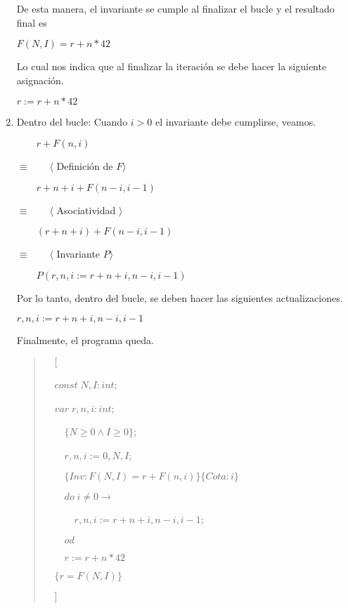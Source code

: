 \documentclass[hidelinks]{article}
\newenvironment{absolutelynopagebreak}
{\Needspace{10\baselineskip}\begin{quote}}
		{\end{quote}}
\begin{document}
\begin{enumerate}
	      De esta manera, el invariante se cumple al finalizar el bucle y el resultado
	      final es \par
	      $F(N,I) = r + n * 42$\par
	      Lo cual nos indica que al finalizar la iteración se debe hacer la siguiente
	      asignación.\par
	      \begin{center}
		      $r := r + n * 42$\par
	      \end{center}
	\item Dentro del bucle: Cuando $i > 0$ el invariante debe cumplirse, veamos.\par
	      $\qquad r + F(n,i)$\par
	      $\equiv \qquad \langle$ Definición de $F\rangle$\par
	      $\qquad r + n + i + F(n - i, i - 1)$\par
	      $\equiv \qquad \langle$ Asociatividad $\rangle$\par
	      $\qquad (r + n + i) + F(n - i, i - 1)$\par
	      $\equiv \qquad \langle$ Invariante $P\rangle$\par
	      $\qquad P(r,n,i := r + n + i, n - i, i - 1)$\par

	      Por lo tanto, dentro del bucle, se deben hacer las siguientes actualizaciones.\par
	      \begin{center}
		      $r,n,i := r + n + i, n - i, i - 1$\par
	      \end{center}
	      Finalmente, el programa queda.\par
	      \begin{absolutelynopagebreak}
		      $\quad [$\par
				      $\quad const \; N, I : int$;\par
				      $\quad var \; r,n,i : int$;\par
				      $\qquad \{N \geq 0 \land I \geq 0\}$;\par
				      $\qquad r, n, i := 0, N, I$;\par
				      $\qquad \{Inv: F(N,I) = r + F(n,i)\} \{Cota: i\}$\par
				      $\qquad do \; i \neq 0 \rightarrow$\par
				      $\qquad \quad r, n, i := r + n + i, n - i, i - 1$;\par
				      $\qquad od$\par
				      $\qquad r := r + n * 42$\par
				      $\quad \{r = F(N,I)\}$ \par
				      $\quad ]$\par
	      \end{absolutelynopagebreak}\par
\end{enumerate}
\end{document}

